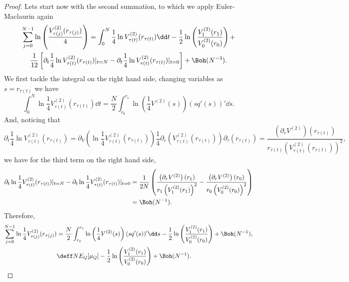 \begin{proof}
	Lets start now with the second summation, to which we apply Euler-Maclaurin again
	\begin{multline}
		\sum_{j=0}^{N-1} \ln\left(\frac{V^{(2)}_{\tau(j)}(r_{\tau(j)})}{4}\right) = \int_{0}^{N} \frac{1}{4} \ln V^{(2)}_{\tau(t)}(r_{\tau(t)}) \dd t - \frac{1}{2} \ln \left( \frac{V^{(2)}_{1}(r_1)}{V^{(2)}_{0}(r_{0})} \right) + \\ \frac{1}{12} \left[ \partial_t \frac{1}{4} \ln V^{(2)}_{\tau(t)}(r_{\tau(t)}) |_{t=N} - \partial_t \frac{1}{4} \ln V^{(2)}_{\tau(t)}(r_{\tau(t)}) |_{t=0}\right]  + \Boh(N^{-3}).
	\end{multline}
	We first tackle the integral on the right hand side, changing variables as $s = r_{\tau(t)}$ we have
	\begin{equation}
		\int_{0}^{N} \ln \frac{1}{4} V^{(2)}_{\tau(t)}(r_{\tau(t)}) \dd t = \frac{N}{2} \int_{r_0}^{r_1} \ln\left( \frac{1}{4} V^{(2)}(s)\right) (sq'(s))' \dd s.
	\end{equation}
	And, noticing that
	\begin{equation}
		\partial_t \frac{1}{4} \ln V^{(2)}_{\tau(t)}(r_{\tau(t)}) = \partial_V \left( \ln \frac{1}{4} V^{(2)}_{\tau(t)}(r_{\tau(t)}) \right) \frac{1}{4} \partial_r \left( V^{(2)}_{\tau(t)}(r_{\tau(t)}) \right) \partial_\tau \left( r_{\tau(t)} \right) = \frac{\left(\partial_r V^{(2)}\right)(r_{\tau(t)})}{r_{\tau(t)} \left( V^{(2)}_{\tau(t)}(r_{\tau(t)})\right)^2},
	\end{equation}
	we have for the third term on the right hand side, 
	\begin{align}
		\partial_t \ln \frac{1}{4} V^{(2)}_{\tau(t)}(r_{\tau(t)}) |_{t=N} - \partial_t \ln \frac{1}{4} V^{(2)}_{\tau(t)}(r_{\tau(t)}) |_{t=0} & = \frac{1}{2N} \left( \frac{\left(\partial_r V^{(2)}\right)(r_{1})}{r_1 \left( V^{(2)}_1(r_1)\right)^2} - \frac{\left(\partial_r V^{(2)}\right)(r_{0})}{r_0 \left( V^{(2)}_0(r_0)\right)^2}\right) \\ & = \Boh(N^{-1}).
	\end{align}
	Therefore,
	\begin{align}
		\sum_{j=0}^{N-1}  \ln \frac{1}{4} V^{(2)}_{\tau(j)}(r_{\tau(j)})  & = \frac{N}{2} \int_{r_0}^{r_1} \ln\left(\frac{1}{4} V^{(2)}(s)\right) (sq'(s))' \dd s  -   \frac{1}{2} \ln \left( \frac{V^{(2)}_{1}(r_1)}{V^{(2)}_{0}(r_{0})} \right) + \Boh(N^{-1}), \\
		& \deff N E_Q[\mu_Q]  -   \frac{1}{2} \ln \left( \frac{V^{(2)}_{1}(r_1)}{V^{(2)}_{0}(r_{0})} \right) + \Boh(N^{-1}).		
		\label{Equation: logV annulus}
	\end{align}
	

\end{proof}
